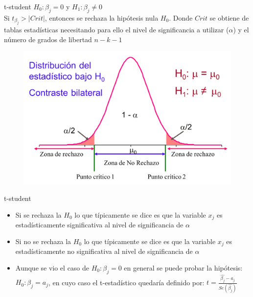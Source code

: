 \begin{frame}{t-student}
	$H_{0}: \beta_{j}=0$ y $H_{1}: \beta_{j}\neq 0$ \\
	Si $t_{\beta_{j}}>|Crit|$, entonces se rechaza la hipótesis nula $H_{0}$. Donde $Crit$ se obtiene de tablas estadísticas necesitando para ello el nivel de significancia a utilizar ($\alpha$) y el número de grados de libertad $n-k-1$
	\begin{figure}[H]
		\begin{centering}
			\includegraphics[scale=0.4]{fig/RegionCritica.png}
		\end{centering}
	\end{figure}
\end{frame}
\begin{frame}{t-student}
	\begin{itemize}
		\item Si se rechaza la $H_{0}$ lo que típicamente se dice es que la variable $x_{j}$ es estadísticamente significativa al nivel de significancia de $\alpha$
		\item Si no se rechaza la $H_{0}$ lo que típicamente se dice es que la variable $x_{j}$ es estadísticamente no significativa al nivel de significancia de $\alpha$
		\item Aunque se vio el caso de $H_{0}: \beta_{j}=0$ en general se puede probar la hipótesis: $H_{0}: \beta_{j}=a_{j}$, en cuyo caso el t-estadístico quedaría definido por: $t=\frac{\hat{\beta_{j}}-a_{j}}{Se(\hat{\beta_{j}})}$
	\end{itemize}
\end{frame}
